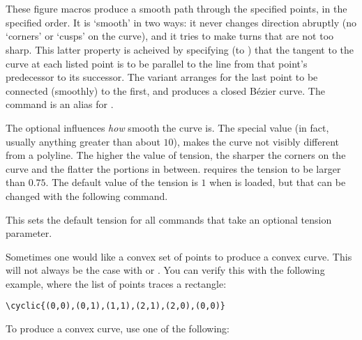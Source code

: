 \documentclass[letterpaper]{article}
\begin{document}
\begin{cd}
\\
\\
%
%
%
\end{cd}

These figure macros produce a smooth path through the specified points,
in the specified order. It is `smooth' in two ways: it never changes
direction abruptly (no `corners' or `cusps' on the curve), and it tries
to make turns that are not too sharp. This latter property is acheived
by specifying (to \MF{}) that the tangent to the curve at each listed
point is to be parallel to the line from that point's predecessor to its
successor. The  variant arranges for the last point to be
connected (smoothly) to the first, and produces a closed \MF{} B\'ezier
curve. The command  is an alias for .

The optional  influences \emph{how} smooth the curve is.
The special value  (in fact, usually anything greater than
about $10$), makes the curve not visibly different from a polyline. The
higher the value of tension, the sharper the corners on the curve and
the flatter the portions in between. \CMF{} requires the tension to be
larger than $0.75$. The default value of the tension is $1$ when \mfp{} is
loaded, but that can be changed with the following command.

\begin{cd}
%
\end{cd}

This sets the default tension for all commands that take an optional
tension parameter.

Sometimes one would like a convex set of points to produce a convex
curve. This will not always be the case with  or .
You can verify this with the following example, where the list of points
traces a rectangle:
\begin{verbatim}
\cyclic{(0,0),(0,1),(1,1),(2,1),(2,0),(0,0)}
\end{verbatim}
To produce a convex curve, use one of the following:
\end{document}
